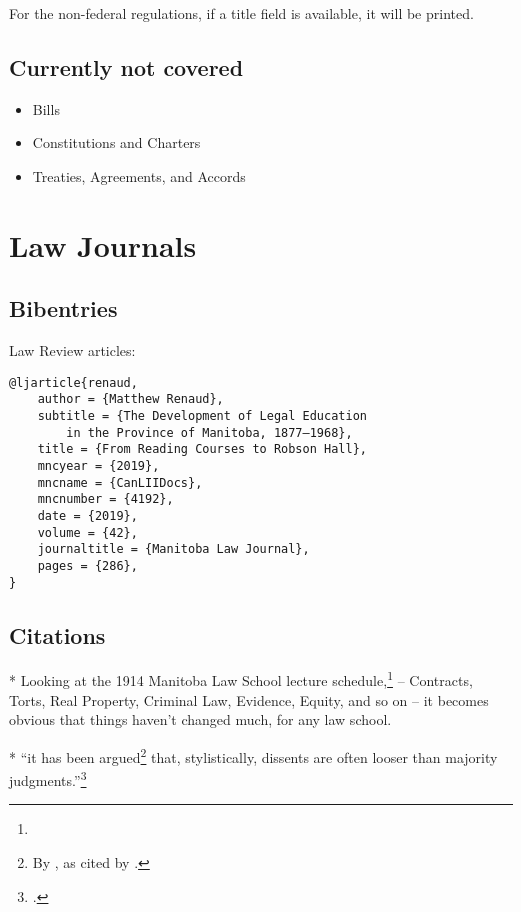 For the non-federal regulations, if a title field is available, it will be printed.
\bigskip


\subsection{Currently not covered}
\begin{itemize}
\item Bills
\item Constitutions and Charters
\item Treaties, Agreements, and Accords
\end{itemize}


\section{Law Journals}
\subsection{Bibentries}

Law Review articles: \par\bigskip
\begin{verbatim}
@ljarticle{renaud,
	author = {Matthew Renaud},
	subtitle = {The Development of Legal Education 
		in the Province of Manitoba, 1877–1968},
	title = {From Reading Courses to Robson Hall},
	mncyear = {2019},
	mncname = {CanLIIDocs},
	mncnumber = {4192},
	date = {2019},
	volume = {42},
	journaltitle = {Manitoba Law Journal},
	pages = {286},
}
\end{verbatim}

\subsection{Citations}


* Looking at the 1914 Manitoba Law School lecture schedule,\footnote{} -- Contracts, Torts, Real Property, Criminal Law, Evidence, Equity, and so on -- it becomes obvious that things haven't changed much, for any law school.

* ``it has been argued\footnote{By , as cited by .} that, stylistically,
dissents are often looser than majority judgments.''\footnote{.}\bigskip 

